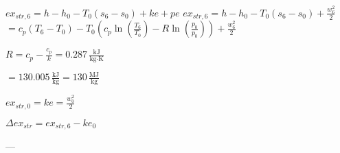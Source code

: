 \( ex_{str,6} = h - h_0 - T_0(s_6 - s_0) + ke + pe \)  
\( ex_{str,6} = h - h_0 - T_0(s_6 - s_0) + \frac{w_6^2}{2} \)  
\( = c_p(T_6 - T_0) - T_0(c_p \ln(\frac{T_6}{T_0}) - R \ln(\frac{p_0}{p_0})) + \frac{w_6^2}{2} \)  

\( R = c_p - \frac{c_p}{k} = 0.287 \, \frac{\text{kJ}}{\text{kg·K}} \)  

\( = 130.005 \, \frac{\text{kJ}}{\text{kg}} = 130 \, \frac{\text{MJ}}{\text{kg}} \)  

\( ex_{str,0} = ke = \frac{w_0^2}{2} \)  

\( \Delta ex_{str} = ex_{str,6} - ke_0 \)  

---